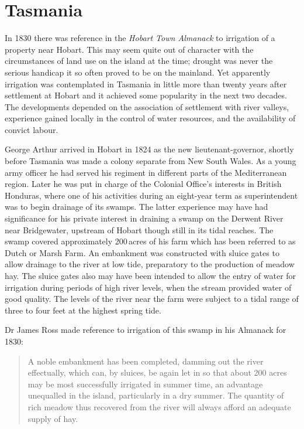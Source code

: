 \section*{Tasmania}
\label{sec:tas}

In 1830 there was reference in the \textsl{Hobart Town Almanack} to
irrigation of a property near Hobart. This may
seem quite out of character with the circumstances of land use on the
island at the time; drought was never the serious handicap it so often
proved to be on the mainland.  Yet apparently irrigation was
contemplated in Tasmania in little more than twenty years after
settlement at Hobart and it achieved some popularity in the next two
decades.  The developments depended on the association of settlement
with river valleys, experience gained locally in the control of water
resources, and the availability of convict labour.

George Arthur arrived in Hobart in 1824 as the new
lieutenant-gov\-er\-nor, shortly before Tasmania was made a colony
separate from New South Wales.  As a young army officer he had served
his regiment in different parts of the Mediterranean region.  Later he
was put in charge of the Colonial Office's interests in British
Honduras, where one of his activities during an eight-year term as
superintendent was to begin drainage of its swamps.  The latter
experience may have had significance for his private interest in
draining a swamp on the Derwent River near
Bridgewater, upstream of Hobart though still
in its tidal reaches. The swamp covered approximately 200\,acres of
his farm which has been referred to as Dutch or Marsh
Farm. An embankment was constructed with sluice
gates to allow drainage to the river at low tide, preparatory to the
production of meadow hay.  The sluice gates also may have been
intended to allow the entry of water for irrigation during periods of
high river levels, when the stream provided water of good quality.
The levels of the river near the farm were subject to a tidal range of
three to four feet at the highest spring tide.

Dr James Ross  made reference to irrigation of this
swamp in his Almanack for 1830:
\begin{quote}
	A noble embankment has been completed, damming out the river
        effectually, which can, by sluices, be again let in so that
        about 200 acres may be most successfully irrigated in summer
        time, an advantage unequalled in the island, particularly in a
        dry summer. The quantity of rich meadow thus recovered from
        the river will always afford an adequate supply of
        hay.
\end{quote}

